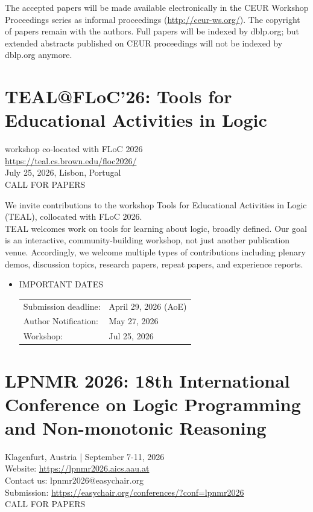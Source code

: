\documentclass[prodmode,acmtecs]{acmsmall} %
\begin{document}
\begin{itemize}
  The accepted papers will be made available electronically in the CEUR Workshop Proceedings series as informal proceedings (\href{http://ceur-ws.org/}{http://ceur-ws.org/}). The copyright of papers remain with the authors. Full papers will be indexed by dblp.org; but extended abstracts published on CEUR proceedings will not be indexed by dblp.org anymore. 
 
\end{itemize}\section{TEAL@FLoC'26: Tools for Educational Activities in Logic}\label{TEALFLoC26}  workshop co-located with FLoC 2026\\ 
  \href{https://teal.cs.brown.edu/floc2026/}{https://teal.cs.brown.edu/floc2026/}\\ 
  July 25, 2026, Lisbon, Portugal\\ 
CALL FOR PAPERS 

  We invite contributions to the workshop Tools for Educational Activities in Logic (TEAL), collocated with FLoC 2026.\\ 
  TEAL welcomes work on tools for learning about logic, broadly defined. Our goal is an interactive, community-building workshop, not just another publication venue. Accordingly, we welcome multiple types of contributions including plenary demos, discussion topics, research papers, repeat papers, and experience reports.\\ 
\begin{itemize}\item  IMPORTANT DATES 
 
\begin{tabulary}{\linewidth}{LL}Submission deadline:  & April 29, 2026 (AoE) \\
Author Notification:  & May 27, 2026 \\
Workshop:  & Jul 25, 2026 \\
\end{tabulary}
 
\end{itemize}\section{LPNMR 2026: 18th International Conference on Logic Programming and Non-monotonic Reasoning }\label{LPNMR2026}  Klagenfurt, Austria | September 7-11, 2026\\ 
  Website: \href{https://lpnmr2026.aics.aau.at}{https://lpnmr2026.aics.aau.at}\\ 
  Contact us: lpnmr2026@easychair.org\\ 
  Submission: \href{https://easychair.org/conferences/?conf=lpnmr2026}{https://easychair.org/conferences/?conf=lpnmr2026}\\ 
CALL FOR PAPERS 
\end{document}
